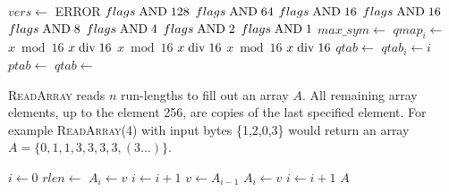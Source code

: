 \documentclass[a4paper]{article}
\begin{document}
\begin{algorithmic}[1]
  \State $vers \gets $
    \State ERROR
  \EndIf
  \settowidth{\maxwidth}{have\_qtab\ }
  \State {} 
  \State {}    $flags\bitand 128$
  \State {}    $flags\bitand 64$
  \State {}    $flags\bitand 16$
  \State {}    $flags\bitand 16$
  \State {} $flags\bitand 8$
  \State {}    $flags\bitand 4$
  \State {}  $flags\bitand 2$
  \State {}   $flags\bitand 1$
  \State {} 
    \State $max\_sym \gets$ 
      \State $qmap_i \gets$ 
    \EndFor
  \EndIf
  \settowidth{\maxwidth}{qshift\ }
  \State {} 
  \State {} $x \bmod 16$
  \State {} $x \bdiv 16$
  \State {} 
  \State {} $x \bmod 16$
  \State {} $x \bdiv 16$
  \State {} 
  \State {} $x \bmod 16$
  \State {} $x \bdiv 16$
    \State $qtab \gets$ 
  \Else
      \State $qtab_i \gets i$
    \EndFor
  \EndIf
    \State $ptab \gets$ 
  \EndIf
    \State $qtab \gets$ 
  \EndIf
\EndProcedure
\end{algorithmic}

\textsc{ReadArray} reads $n$ run-lengths to fill out an array $A$.
All remaining array elements, up to the element 256, are copies of the
last specified element. For example \textsc{ReadArray}(4) with input
bytes \{1,2,0,3\} would return an array $A = \{0,1,1,3,3,3,3, (3 ...)\}$.

\begin{algorithmic}[1]
\State $i \gets 0$
  \State $rlen \gets $
    \State $A_i \gets v$
    \State $i \gets i+1$
  \EndFor
\EndFor
\State $v \gets A_{i-1}$
  \State $A_i \gets v$
  \State $i \gets i+1$
\EndWhile
\State \Return $A$
\EndFunction
\end{algorithmic}
\end{document}
